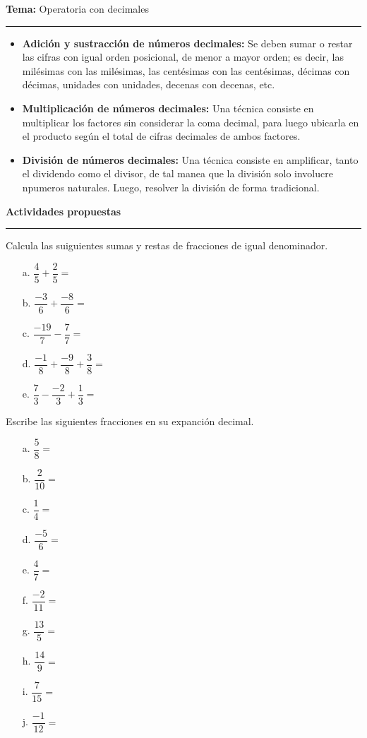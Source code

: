 \documentclass[spanish,letterpaper, 11pt, addpoints, answers]{exam}
\begin{document}
\begin{questions}
\newpage

  \parbox{6in}{
    \textbf{Tema:} Operatoria con decimales}
    \vspace{0.15in}
    \hrule
    
    \begin{itemize}
      \item \textbf{Adición y sustracción de números decimales:} Se deben sumar o restar las cifras con igual orden posicional, de menor a mayor orden; es decir, las milésimas con las milésimas, las centésimas con las centésimas, décimas con décimas, unidades con unidades, decenas con decenas, etc. 
      
      \item \textbf{Multiplicación de números decimales:} Una técnica consiste en multiplicar los factores sin considerar la coma decimal, para luego ubicarla en el producto según el total de cifras decimales de ambos factores.
      \item \textbf{División de números decimales:} Una técnica consiste en amplificar, tanto el dividendo como el divisor, de tal manea que la división solo involucre npumeros naturales. Luego, resolver la división de forma tradicional.
    \end{itemize}

    \parbox{6in}{
      \textbf{Actividades propuestas}}
      \vspace{0.15in}
      \hrule 



\question Calcula las suiguientes sumas y restas de fracciones de igual denominador.

\begin{itemize}
  \item[a.] $\dfrac{4}{5}+\dfrac{2}{5}=$
  \item[b.] $\dfrac{-3}{6}+\dfrac{-8}{6}=$
  \item[c.] $\dfrac{-19}{7}-\dfrac{7}{7}=$
  \item[d.] $\dfrac{-1}{8}+\dfrac{-9}{8}+\dfrac{3}{8}=$
  \item[e.] $\dfrac{7}{3}-\dfrac{-2}{3}+\dfrac{1}{3}=$  
\end{itemize}
\newpage
\question Escribe las siguientes fracciones en su expanción decimal.

\begin{multicols}{2}
\begin{itemize}
  \item[a.] $\dfrac{5}{8}=$
  \item[b.] $\dfrac{2}{10}=$
  \item[c.] $\dfrac{1}{4}=$
  \item[d.] $\dfrac{-5}{6}=$
  \item[e.] $\dfrac{4}{7}=$
  \item[f.] $\dfrac{-2}{11}=$
  \item[g.] $\dfrac{13}{5}=$
  \item[h.] $\dfrac{14}{9}=$
  \item[i.] $\dfrac{7}{15}=$
  \item[j.] $\dfrac{-1}{12}=$  
\end{itemize}
\end{multicols}


\end{questions}
\end{document}
